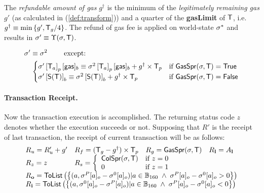 The \emph{refundable amount of gas} $g^{\dagger}$ is the minimum of the \emph{legitimately remaining gas} $g'$ (as calculated in (\ref{def:transform})) and a quarter of the \textbf{gasLimit} of $\textsf{T}$,
	i.e. $g^{\dagger}\equiv \min{\left \{{g', \textsf{T}_g/4} \right \}}$.
The refund of gas fee is applied on world-state $\mathbf{\sigma}^{*}$ and results in $\mathbf{\sigma}'\equiv \Upsilon(\mathbf{\sigma},\textsf{T})$.

\begin{align}
	& \mathbf{\sigma}'  \equiv \mathbf{\sigma}^2 \qquad \mbox{  except:}\\
	& \quad \begin{cases} 
		\mathbf{\sigma}'\left[\textsf{T}_a\right]_p[{\sf gas}]_b \equiv \mathbf{\sigma}^2\left[\textsf{T}_a\right]_p[{\sf gas}]_b+g^{\dagger}\times \textsf{T}_p 
		& \mbox{if $\mathsf{GasSpr}(\mathbf{\sigma},\textsf{T})=\mathsf{True}$}\\
		\mathbf{\sigma}' \left[\mathsf{S}{\left({\textsf{T}} \right)}\right]_b \equiv \mathbf{\sigma}^2\left[\mathsf{S}{\left({\textsf{T}} \right)}\right]_b + g^{\dagger}\times \textsf{T}_p 
		& \mbox{if $\mathsf{GasSpr}(\mathbf{\sigma},\textsf{T})=\mathsf{False}$}
	\end{cases} 
\end{align}

\paragraph{Transaction Receipt.} 

Now the transaction execution is accomplished.
The returning status code $z$ denotes whether the execution succeeds or not. 
Supposing that $R'$ is the receipt of last transaction, 
the receipt of current transaction will be as follows:
\begin{align}
	\begin{array}{llll}
		R_u=R'_u+g' & R_f = (\tx_g-g^{\dagger})\times \tx_p & R_g = \mathsf{GasSpr}(\st,\tx) & R_{\bf l}=A_{\bf l} \\ 
		R_z=z & \multicolumn{3}{l}{R_s = \left\{\begin{array}{ll}
			\mathsf{ColSpr}(\st,\tx) & \text{if }z=0\\
			0 & \text{if }z=1
		\end{array}\right.} \\
		\multicolumn{4}{l}{R_{\bf o}=\mathsf{ToList}\left(\left\{ (a,\st^P[a]_o - \st^0[a]_o) | a\in \B_{160}\;\wedge\; \st^P[a]_o - \st^0[a]_o>0 \right\}\right)}\\
		\multicolumn{4}{l}{R_{\bf i}=\mathsf{ToList}\left(\left\{(a,\st^0[a]_o - \st^P[a]_o) | a\in \B_{160}\;\wedge\; \st^P[a]_o - \st^0[a]_o<0  \right\}\right)}
	\end{array}
\end{align}
